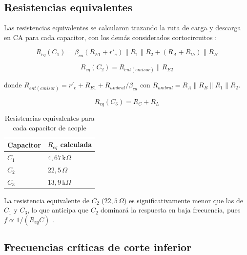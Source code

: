 \documentclass[journal]{IEEEtran}
\begin{document}
\subsection{Resistencias equivalentes}

Las resistencias equivalentes se calcularon trazando la ruta de carga y descarga en CA para cada capacitor, con los dem\'as considerados cortocircuitos \cite{Floyd2008}:

\begin{equation}
    R_{eq}(C_1) = \beta_{ca}(R_{E1} + r'_e)\|R_1\|R_2 + (R_A + R_{th})\|R_B
    \label{eq:req_c1}
\end{equation}

\begin{equation}
    R_{eq}(C_2) = R_{ent(emisor)}\|R_{E2}
    \label{eq:req_c2}
\end{equation}

donde $R_{ent(emisor)} = r'_e + R_{E1} + R_{umbral}/\beta_{ca}$ con $R_{umbral} = R_A\|R_B\|R_1\|R_2$.

\begin{equation}
    R_{eq}(C_3) = R_C + R_L
    \label{eq:req_c3}
\end{equation}

\begin{table}[!ht]
    \centering
    \caption{Resistencias equivalentes para cada capacitor de acople}
    \begin{tabular}{|>{\centering\arraybackslash}m{2cm}|
                     >{\centering\arraybackslash}m{4cm}|}
        \hline
        Capacitor & $R_{eq}$ calculada \\
        \hline
        $C_1$ & $4{,}67\,\text{k}\Omega$ \\
        \hline
        $C_2$ & $22{,}5\,\Omega$          \\
        \hline
        $C_3$ & $13{,}9\,\text{k}\Omega$  \\
        \hline
    \end{tabular}
    \label{tab:req}
\end{table}

La resistencia equivalente de $C_2$ ($22{,}5\,\Omega$) es significativamente menor que las de $C_1$ y $C_3$, lo que anticipa que $C_2$ dominar\'a la respuesta en baja frecuencia, pues $f \propto 1/(R_{eq} C)$ \cite{Floyd2008}.


\subsection{Frecuencias cr\'iticas de corte inferior}
\end{document}
